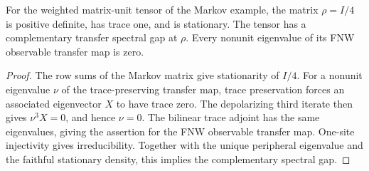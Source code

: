 \begin{lemma}
    \label{thm:fnw-dimension-markov-primitive}
    \leanok
    For the weighted matrix-unit tensor of the Markov example, the matrix
    $\rho=I/4$ is positive definite, has trace one, and is stationary. The tensor
    has a complementary transfer spectral gap at $\rho$. Every nonunit
    eigenvalue of its FNW observable transfer map is zero.
\end{lemma}
\begin{proof}
    \leanok
    The row sums of the Markov matrix give stationarity of $I/4$.
    For a nonunit eigenvalue $\nu$ of the trace-preserving transfer map,
    trace preservation forces an associated eigenvector $X$ to have trace zero.
    The depolarizing third iterate then gives $\nu^3X=0$, and hence $\nu=0$.
    The bilinear trace adjoint has the same eigenvalues, giving the assertion
    for the FNW observable transfer map. One-site injectivity gives
    irreducibility. Together with the unique peripheral eigenvalue and the
    faithful stationary density, this implies the complementary spectral gap.
\end{proof}


